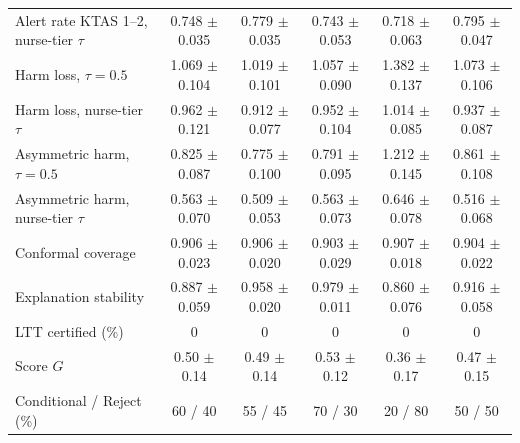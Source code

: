\begin{tabular}{@{}lccccc@{}}
Alert rate KTAS 1--2, nurse-tier $\tau$ & 0.748 $\pm$ 0.035 & 0.779 $\pm$ 0.035 & 0.743 $\pm$ 0.053 & 0.718 $\pm$ 0.063 & 0.795 $\pm$ 0.047 \\
Harm loss, $\tau{=}0.5$ & 1.069 $\pm$ 0.104 & 1.019 $\pm$ 0.101 & 1.057 $\pm$ 0.090 & 1.382 $\pm$ 0.137 & 1.073 $\pm$ 0.106 \\
Harm loss, nurse-tier $\tau$ & 0.962 $\pm$ 0.121 & 0.912 $\pm$ 0.077 & 0.952 $\pm$ 0.104 & 1.014 $\pm$ 0.085 & 0.937 $\pm$ 0.087 \\
Asymmetric harm, $\tau{=}0.5$ & 0.825 $\pm$ 0.087 & 0.775 $\pm$ 0.100 & 0.791 $\pm$ 0.095 & 1.212 $\pm$ 0.145 & 0.861 $\pm$ 0.108 \\
Asymmetric harm, nurse-tier $\tau$ & 0.563 $\pm$ 0.070 & 0.509 $\pm$ 0.053 & 0.563 $\pm$ 0.073 & 0.646 $\pm$ 0.078 & 0.516 $\pm$ 0.068 \\
Conformal coverage & 0.906 $\pm$ 0.023 & 0.906 $\pm$ 0.020 & 0.903 $\pm$ 0.029 & 0.907 $\pm$ 0.018 & 0.904 $\pm$ 0.022 \\
Explanation stability & 0.887 $\pm$ 0.059 & 0.958 $\pm$ 0.020 & 0.979 $\pm$ 0.011 & 0.860 $\pm$ 0.076 & 0.916 $\pm$ 0.058 \\
LTT certified (\%) & 0 & 0 & 0 & 0 & 0 \\
Score $G$ & 0.50 $\pm$ 0.14 & 0.49 $\pm$ 0.14 & 0.53 $\pm$ 0.12 & 0.36 $\pm$ 0.17 & 0.47 $\pm$ 0.15 \\
Conditional / Reject (\%) & 60 / 40 & 55 / 45 & 70 / 30 & 20 / 80 & 50 / 50 \\
\bottomrule
\end{tabular}
